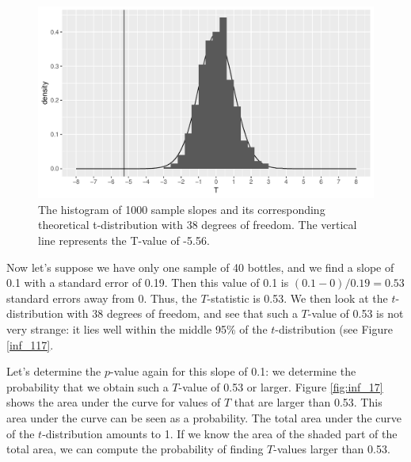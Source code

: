 \documentclass[]{book}\usepackage[]{graphicx}\usepackage[]{color}
\makeatletter
\def\maxwidth{ %
  \ifdim\Gin@nat@width>\linewidth
    \linewidth
  \else
    \Gin@nat@width
  \fi
}
\newenvironment{knitrout}{}{} %
\makeatother
\begin{document}
\begin{knitrout}
\color{fgcolor}\begin{figure}

{\centering \includegraphics[width=\maxwidth]{figure/inf_117-1} 

}

\caption[The histogram of 1000 sample slopes and its corresponding theoretical t-distribution with 38 degrees of freedom]{The histogram of 1000 sample slopes and its corresponding theoretical t-distribution with 38 degrees of freedom. The vertical line represents the T-value of -5.56.}\label{fig:inf_117}
\end{figure}


\end{knitrout}

Now let's suppose we have only one sample of 40 bottles, and we find a slope of 0.1 with a standard error of 0.19. Then this value of 0.1 is $(0.1-0)/0.19=0.53$ standard errors away from 0. Thus, the $T$-statistic is 0.53. We then look at the $t$-distribution with 38 degrees of freedom, and see that such a $T$-value of 0.53 is not very strange: it lies well within the middle 95\% of the $t$-distribution (see Figure \ref{inf_117}.

Let's determine the $p$-value again for this slope of 0.1: we determine the probability that we obtain such a $T$-value of 0.53 or larger. Figure \ref{fig:inf_17} shows the area under the curve for values of $T$ that are larger than 0.53. This area under the curve can be seen as a probability. The total area under the curve of the $t$-distribution amounts to 1. If we know the area of the shaded part of the total area, we can compute the probability of finding $T$-values larger than 0.53.
\end{document}
